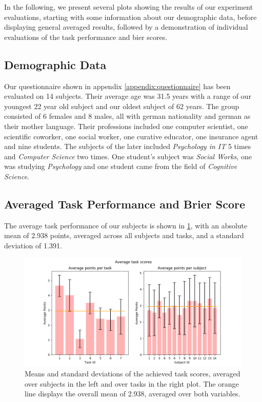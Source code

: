 \documentclass[../main/main.tex]{subfiles}
\begin{document}
In the following, we present several plots showing the results of our experiment evaluations, starting with some information about our demographic data, before displaying general averaged results, followed by a demonstration of individual evaluations of the task performance and bier scores.

\subsection{Demographic Data}
Our questionnaire shown in appendix \ref{appendix:questionnaire} has been evaluated on 14 subjects. Their average age was 31.5 years with a range of our youngest 22 year old subject and our oldest subject of 62 years. The group consisted of 6 females and 8 males, all with german nationality and german as their mother language. Their professions included one computer scientist, one scientific coworker, one social worker, one curative educator, one insurance agent and nine students. The subjects of the later included \textit{Psychology in IT} 5 times and \textit{Computer Science} two times. One student's subject was \textit{Social Works}, one was studying \textit{Psychology} and one student came from the field of \textit{Cognitive Science}.

\subsection{Averaged Task Performance and Brier Score}
The average task performance of our subjects is shown in \ref{fig:avg_scores}, with an absolute mean of 2.938 points, averaged across all subjects and tasks, and a standard deviation of 1.391.
\begin{figure}[H]
	\centering
	\includegraphics[width=\textwidth]{../assets/average_task_scores.png}
	\caption{Means and standard deviations of the achieved task scores, averaged over subjects in the left and over tasks in the right plot. The orange line displays the overall mean of 2.938, averaged over both variables.}
	\label{fig:avg_scores}
\end{figure}
\end{document}
